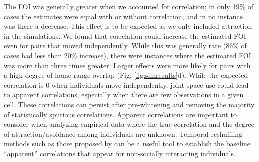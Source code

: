 \documentclass[letterpaper]{article}
\begin{document}
The FOI was generally greater when we accounted for correlation; in only 19\% of cases the estimates were equal with or without correlation, and in no instance was there a decrease. This effect is to be expected as we only included attraction in the simulations. 
We found that correlation could increase the estimated FOI even for pairs that moved independently. While this was generally rare (86\% of cases had less than 20\% increase), %
there were  instances where the estimated FOI was more than three times greater. Larger effects were more likely for pairs with a high degree of home range overlap (Fig. \ref{fig:simresults}d). 
While the expected correlation is 0 when individuals move independently, joint space use could lead to apparent correlations, especially when there are few observations in a given cell. These correlations can persist after pre-whitening and removing the majority of statistically spurious correlations. Apparent correlations are important to consider when analyzing empirical data where the true correlation and the degree of attraction/avoidance among individuals are unknown. Temporal reshuffling methods such as those proposed by \citet{Spiegel2016} can be a useful tool to establish the baseline ``apparent'' correlations that appear for non-socially interacting individuals.
\end{document}
